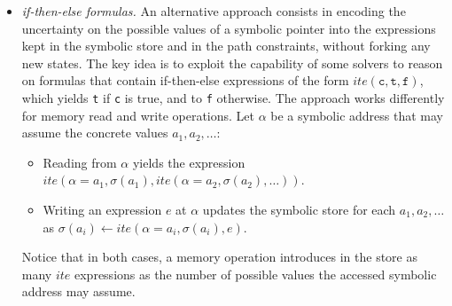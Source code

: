 \begin{itemize}
\item {\em if-then-else formulas.} An alternative approach consists in encoding the uncertainty on the possible values of a symbolic pointer into the expressions kept in the symbolic store and in the path constraints, without forking any new states. The key idea is to exploit the capability of some solvers to reason on formulas that contain if-then-else expressions of the form $ite(\texttt{c}, \texttt{t}, \texttt{f})$, which yields \texttt{t} if \texttt{c} is true, and to \texttt{f} otherwise. The approach works differently for memory read and write operations. Let $\alpha$ be a symbolic address that may assume the concrete values $a_1, a_2, \ldots$:
\begin{itemize}
\item Reading from $\alpha$ yields the expression $ite(\alpha=a_1,\sigma(a_1), ite(\alpha=a_2,\sigma(a_2), \ldots))$.
\item Writing an expression $e$ at $\alpha$ updates the symbolic store for each $a_1, a_2, \ldots$ as $\sigma(a_i)\gets ite(\alpha=a_i,\sigma(a_i),e)$.
\end{itemize}
Notice that in both cases, a memory operation introduces in the store as many $ite$ expressions as the number of possible values the accessed symbolic address may assume.


\end{itemize}
